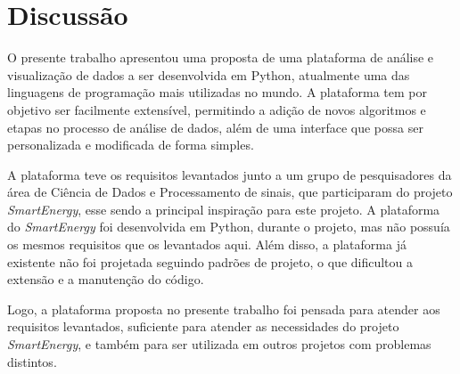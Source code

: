 \section{Discussão}
    \label{sec:discussao}

    O presente trabalho apresentou uma proposta de uma plataforma de análise e visualização de dados a ser desenvolvida em Python, atualmente uma das linguagens de programação mais utilizadas no mundo. A plataforma tem por objetivo ser facilmente extensível, permitindo a adição de novos algoritmos e etapas no processo de análise de dados, além de uma interface que possa ser personalizada e modificada de forma simples.

    A plataforma teve os requisitos levantados junto a um grupo de pesquisadores da área de Ciência de Dados e Processamento de sinais, que participaram do projeto \textit{SmartEnergy}, esse sendo a principal inspiração para este projeto. A plataforma do \textit{SmartEnergy} foi desenvolvida em Python, durante o projeto, mas não possuía os mesmos requisitos que os levantados aqui. Além disso, a plataforma já existente não foi projetada seguindo padrões de projeto, o que dificultou a extensão e a manutenção do código.

    Logo, a plataforma proposta no presente trabalho foi pensada para atender aos requisitos levantados, suficiente para atender as necessidades do projeto \textit{SmartEnergy}, e também para ser utilizada em outros projetos com problemas distintos.
